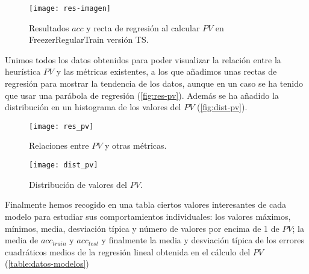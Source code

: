 \begin{figure}[htbp]
  \centering
  \hspace*{-1cm}
  \texttt{[image: res-imagen]}
  \caption{Resultados $acc$ y recta de regresión al calcular $PV$ en FreezerRegularTrain versión TS.}
  \label{fig:res-imagen}
\end{figure}

Unimos todos los datos obtenidos para poder visualizar la relación entre la heurística $PV$ y las métricas existentes, a los que añadimos unas rectas de regresión para mostrar la tendencia de los datos, aunque en un caso se ha tenido que usar una parábola de regresión (\autoref{fig:res-pv}). Además se ha añadido la distribución en un histograma de los valores del $PV$ (\autoref{fig:dist-pv}).

\begin{figure}[htbp]
  \centering
  \hspace*{-1cm}
  \texttt{[image: res\_pv]}
  \caption{Relaciones entre $PV$ y otras métricas.}
  \label{fig:res-pv}
\end{figure}

\begin{figure}[htbp]
  \centering
  \texttt{[image: dist\_pv]}
  \caption{Distribución de valores del $PV$.}
  \label{fig:dist-pv}
\end{figure}

Finalmente hemos recogido en una tabla ciertos valores interesantes de cada modelo para estudiar sus comportamientos individuales: los valores máximos, mínimos, media, desviación típica y número de valores por encima de 1 de $PV$; la media de $acc_{train}$ y $acc_{test}$ y finalmente la media y desviación típica de los errores cuadráticos medios de la regresión lineal obtenida en el cálculo del $PV$ (\autoref{table:datos-modelos})

